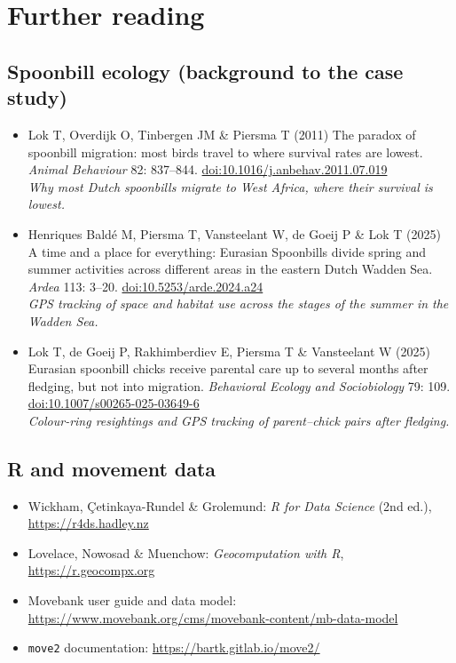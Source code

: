 \documentclass[11pt,a4paper]{article}
\begin{document}
\section{Further reading}

\subsection{Spoonbill ecology (background to the case study)}
\begin{itemize}[leftmargin=*]
\item Lok T, Overdijk O, Tinbergen JM \& Piersma T (2011) The paradox of spoonbill migration: most birds travel to where survival rates are lowest. \textit{Animal Behaviour} 82: 837--844. \href{https://doi.org/10.1016/j.anbehav.2011.07.019}{doi:10.1016/j.anbehav.2011.07.019}\\
\textit{Why most Dutch spoonbills migrate to West Africa, where their survival is lowest.}
\item Henriques Baldé M, Piersma T, Vansteelant W, de Goeij P \& Lok T (2025) A time and a place for everything: Eurasian Spoonbills divide spring and summer activities across different areas in the eastern Dutch Wadden Sea. \textit{Ardea} 113: 3--20. \href{https://doi.org/10.5253/arde.2024.a24}{doi:10.5253/arde.2024.a24}\\
\textit{GPS tracking of space and habitat use across the stages of the summer in the Wadden Sea.}
\item Lok T, de Goeij P, Rakhimberdiev E, Piersma T \& Vansteelant W (2025) Eurasian spoonbill chicks receive parental care up to several months after fledging, but not into migration. \textit{Behavioral Ecology and Sociobiology} 79: 109. \href{https://doi.org/10.1007/s00265-025-03649-6}{doi:10.1007/s00265-025-03649-6}\\
\textit{Colour-ring resightings and GPS tracking of parent--chick pairs after fledging.}
\end{itemize}

\subsection{R and movement data}
\begin{itemize}[leftmargin=*]
\item Wickham, Çetinkaya-Rundel \& Grolemund: \textit{R for Data Science} (2nd ed.), \url{https://r4ds.hadley.nz}
\item Lovelace, Nowosad \& Muenchow: \textit{Geocomputation with R}, \url{https://r.geocompx.org}
\item Movebank user guide and data model: \url{https://www.movebank.org/cms/movebank-content/mb-data-model}
\item \texttt{move2} documentation: \url{https://bartk.gitlab.io/move2/}
\end{itemize}
\end{document}
